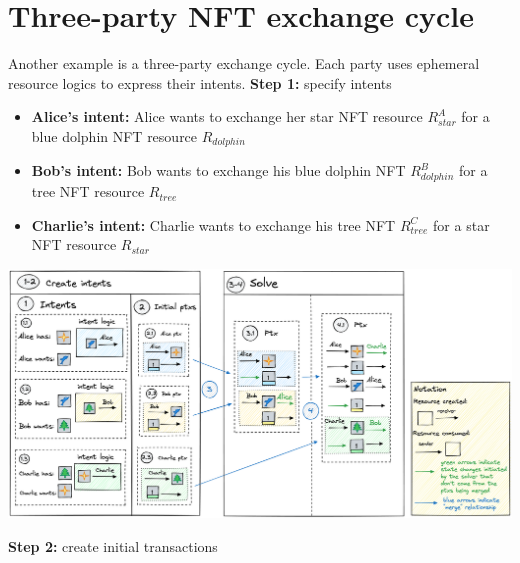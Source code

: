 \documentclass[
    11pt,            %
    techreport,        %
    affiltop,       %
]{art}
\begin{document}
\nocite{*}


\appendix
\section{Three-party NFT exchange cycle}
Another example is a three-party exchange cycle. Each party uses ephemeral resource logics to express their intents.
\hfill\break
\hfill\break
\textbf{Step 1:} specify intents

\begin{itemize}
    \item \textbf{Alice's intent:} Alice wants to exchange her star NFT resource $R^A_{star}$ for a blue dolphin NFT resource $R_{dolphin}$
    \item \textbf{Bob's intent:} Bob wants to exchange his blue dolphin NFT $R^B_{dolphin}$ for a tree NFT resource $R_{tree}$
    \item \textbf{Charlie's intent:} Charlie wants to exchange his tree NFT $R^C_{tree}$ for a star NFT resource $R_{star}$
\end{itemize}

\begin{center}
    \includegraphics[width = \textwidth]{3party_rm_new.png}
\end{center}

\textbf{Step 2:} create initial transactions
\end{document}
